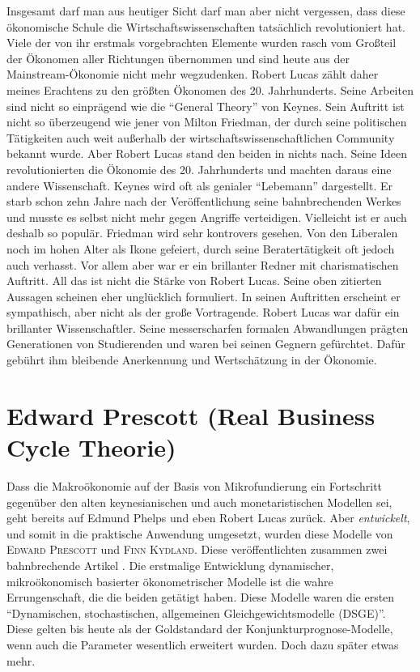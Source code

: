 Insgesamt darf man aus heutiger Sicht darf man aber nicht vergessen, dass diese ökonomische Schule die Wirtschaftswissenschaften tatsächlich revolutioniert hat. Viele der von ihr erstmals vorgebrachten Elemente wurden rasch vom Großteil der Ökonomen aller Richtungen übernommen und sind heute aus der Mainstream-Ökonomie nicht mehr wegzudenken. Robert Lucas zählt daher meines Erachtens zu den größten Ökonomen des 20. Jahrhunderts. Seine Arbeiten sind nicht so einprägend wie die "`General Theory"' von Keynes. Sein Auftritt ist nicht so überzeugend wie jener von Milton Friedman, der durch seine politischen Tätigkeiten auch weit außerhalb der wirtschaftswissenschaftlichen Community bekannt wurde. Aber Robert Lucas stand den beiden in nichts nach. Seine Ideen revolutionierten die Ökonomie des 20. Jahrhunderts und machten daraus eine andere Wissenschaft. Keynes wird oft als genialer "`Lebemann"' dargestellt. Er starb schon zehn Jahre nach der Veröffentlichung seine bahnbrechenden Werkes und musste es selbst nicht mehr gegen Angriffe verteidigen. Vielleicht ist er auch deshalb so populär. Friedman wird sehr kontrovers gesehen. Von den Liberalen noch im hohen Alter als Ikone gefeiert, durch seine Beratertätigkeit oft jedoch auch verhasst. Vor allem aber war er ein brillanter Redner mit charismatischen Auftritt. All das ist nicht die Stärke von Robert Lucas. Seine oben zitierten Aussagen scheinen eher unglücklich formuliert. In seinen Auftritten erscheint er sympathisch, aber nicht als der große Vortragende. Robert Lucas war dafür ein brillanter Wissenschaftler. Seine messerscharfen formalen Abwandlungen prägten Generationen von Studierenden und waren bei seinen Gegnern gefürchtet. Dafür gebührt ihm bleibende Anerkennung und Wertschätzung in der Ökonomie.


\section{Edward Prescott (Real Business Cycle Theorie)}
\label{RBC}
Dass die Makroökonomie auf der Basis von Mikrofundierung ein Fortschritt gegenüber den alten keynesianischen und auch monetaristischen Modellen sei, geht bereits auf Edmund Phelps und eben Robert Lucas zurück. Aber \textit{entwickelt}, und somit in die praktische Anwendung umgesetzt, wurden diese Modelle von \textsc{Edward Prescott} und \textsc{Finn Kydland}. Diese veröffentlichten zusammen zwei bahnbrechende Artikel \parencite{Kydland1977, Kydland1982}. Die erstmalige Entwicklung dynamischer, mikroökonomisch basierter ökonometrischer Modelle ist die wahre Errungenschaft, die die beiden getätigt haben. Diese Modelle waren die ersten "`Dynamischen, stochastischen, allgemeinen Gleichgewichtsmodelle (DSGE)"'. Diese gelten bis heute als der Goldstandard der Konjunkturprognose-Modelle, wenn auch die Parameter wesentlich erweitert wurden. Doch dazu später etwas mehr.

